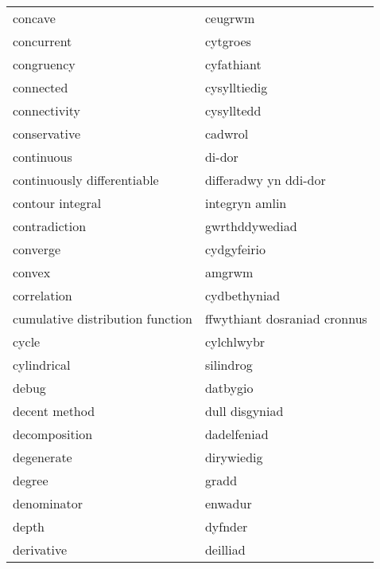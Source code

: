 \begin{supertabular}{p{0.22\textwidth}p{0.22\textwidth}}
                          concave &                          ceugrwm \\
                       concurrent &                         cytgroes \\
                       congruency &                       cyfathiant \\
                        connected &                     cysylltiedig \\
                     connectivity &                       cysylltedd \\
                     conservative &                          cadwrol \\
                       continuous &                           di-dor \\
      continuously differentiable &            differadwy yn ddi-dor \\
                 contour integral &                   integryn amlin \\
                    contradiction &                   gwrthddywediad \\
                         converge &                      cydgyfeirio \\
                           convex &                           amgrwm \\
                      correlation &                     cydbethyniad \\
 cumulative distribution function &     ffwythiant dosraniad cronnus \\
                            cycle &                       cylchlwybr \\
                      cylindrical &                        silindrog \\
                            debug &                         datbygio \\
                    decent method &                   dull disgyniad \\
                    decomposition &                      dadelfeniad \\
                       degenerate &                       dirywiedig \\
                           degree &                            gradd \\
                      denominator &                          enwadur \\
                            depth &                          dyfnder \\
                       derivative &                         deilliad \\

\end{supertabular}
